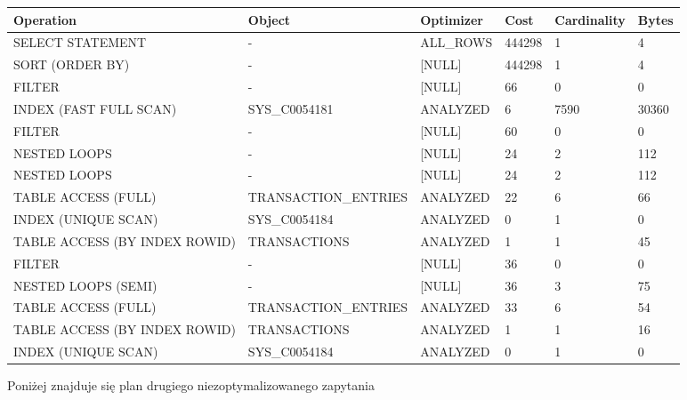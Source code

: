 \documentclass[11pt]{article}
\numberwithin{figure}{subsection}
\begin{document}
		\begin{tabularx}{\textwidth}{|X|X|X|X|X|X|}
Operation&Object&Optimizer&Cost&Cardinality&Bytes\\ \hline
SELECT STATEMENT& - &ALL\_ROWS&444298&1&4\\ \hline
SORT (ORDER BY)& - &[NULL]&444298&1&4\\ \hline
FILTER& - &[NULL]&66&0&0\\ \hline
INDEX (FAST FULL SCAN)&SYS\_C0054181&ANALYZED&6&7590&30360\\ \hline
FILTER& - &[NULL]&60&0&0\\ \hline
NESTED LOOPS& - &[NULL]&24&2&112\\ \hline
NESTED LOOPS& - &[NULL]&24&2&112\\ \hline
TABLE ACCESS (FULL)&TRANSACTION\_ENTRIES&ANALYZED&22&6&66\\ \hline
INDEX (UNIQUE SCAN)&SYS\_C0054184&ANALYZED&0&1&0\\ \hline
TABLE ACCESS (BY INDEX ROWID)&TRANSACTIONS&ANALYZED&1&1&45\\ \hline
FILTER& - &[NULL]&36&0&0\\ \hline
NESTED LOOPS (SEMI)& - &[NULL]&36&3&75\\ \hline
TABLE ACCESS (FULL)&TRANSACTION\_ENTRIES&ANALYZED&33&6&54\\ \hline
TABLE ACCESS (BY INDEX ROWID)&TRANSACTIONS&ANALYZED&1&1&16\\ \hline
INDEX (UNIQUE SCAN)&SYS\_C0054184&ANALYZED&0&1&0\\ \hline
		\end{tabularx}
		
		Poniżej znajduje się plan drugiego niezoptymalizowanego zapytania \\
		
\end{document}
